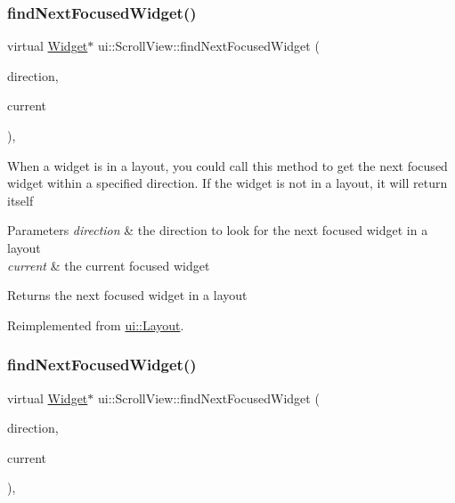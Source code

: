 \subsubsection{\texorpdfstring{find\+Next\+Focused\+Widget()}{findNextFocusedWidget()}\hspace{0.1cm}{\footnotesize\ttfamily [1/2]}}
{\footnotesize\ttfamily virtual \hyperlink{classui_1_1Widget}{Widget}$\ast$ ui\+::\+Scroll\+View\+::find\+Next\+Focused\+Widget (\begin{DoxyParamCaption}\item[{\hyperlink{classui_1_1Widget_a8ae8e8fc793a04a87584205cd1e8a8a5}{Focus\+Direction}}]{direction,  }\item[{\hyperlink{classui_1_1Widget}{Widget} $\ast$}]{current }\end{DoxyParamCaption})\hspace{0.3cm}{\ttfamily [override]}, {\ttfamily [virtual]}}

When a widget is in a layout, you could call this method to get the next focused widget within a specified direction. If the widget is not in a layout, it will return itself 
\begin{DoxyParams}{Parameters}
{\em direction} & the direction to look for the next focused widget in a layout \\
\hline
{\em current} & the current focused widget \\
\hline
\end{DoxyParams}
\begin{DoxyReturn}{Returns}
the next focused widget in a layout 
\end{DoxyReturn}


Reimplemented from \hyperlink{classui_1_1Layout_a49f3db931bff292e279ddd65dcd3fe6f}{ui\+::\+Layout}.

\mbox{\label{classui_1_1ScrollView_adda46d15b5742af6e64a96b23c3ca10a}} 
\subsubsection{\texorpdfstring{find\+Next\+Focused\+Widget()}{findNextFocusedWidget()}\hspace{0.1cm}{\footnotesize\ttfamily [2/2]}}
{\footnotesize\ttfamily virtual \hyperlink{classui_1_1Widget}{Widget}$\ast$ ui\+::\+Scroll\+View\+::find\+Next\+Focused\+Widget (\begin{DoxyParamCaption}\item[{\hyperlink{classui_1_1Widget_a8ae8e8fc793a04a87584205cd1e8a8a5}{Focus\+Direction}}]{direction,  }\item[{\hyperlink{classui_1_1Widget}{Widget} $\ast$}]{current }\end{DoxyParamCaption})\hspace{0.3cm}{\ttfamily [override]}, {\ttfamily [virtual]}}

